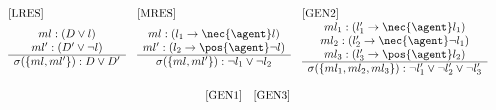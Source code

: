 \begin{figure*}[t]
	\[
	\begin{array}{c}
	\begin{array}{lll}
	\textnormal{[LRES]} & \textnormal{[MRES]} & \textnormal{[GEN2]} \\
	\begin{array}{c}
	ml: (D \lor l) \\
	ml': (D' \lor \neg l) \\
	\hline
	\sigma(\{ml, ml'\}): D \lor D' \\
	\end{array}
	&
	
	\begin{array}{c}
	ml: (l_1 \rightarrow \nec{\agent} l) \\
	ml': (l_2 \rightarrow \pos{\agent} \neg l) \\
	\hline
	\sigma(\{ml, ml'\}): \neg l_1 \lor \neg l_2 \\
	\end{array}
	&
	
	\begin{array}{c}
	ml_1: (l_1' \rightarrow \nec{\agent} l_1) \\
	ml_2: (l_2' \rightarrow \nec{\agent} \neg l_1) \\
	ml_3: (l_3' \rightarrow \pos{\agent} l_2) \\
	\hline
	\sigma(\{ml_1, ml_2, ml_3\}): \neg l_1' \lor \neg l_2' \lor \neg l_3' \\
	\end{array}
	
	
	\\ \end{array} \\ \\
	
	\begin{array}{ll}
	\textnormal{[GEN1]} & \textnormal{[GEN3]} \\
	

\end{array}
\end{array}\]
\end{figure*}
